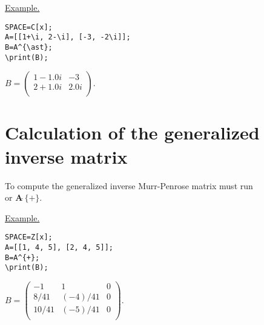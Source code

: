 \underline{Example. }

\vspace*{-2mm}
\begin{verbatim}
SPACE=C[x];
A=[[1+\i, 2-\i], [-3, -2\i]];
B=A^{\ast};
\print(B);
\end{verbatim}
 
{$
B = \left(\begin{array}{cc}
1-1. 0i& -3  \\
 2+1. 0i& 2. 0i\\ \end{array}\right). $}

\section{Calculation of the generalized inverse matrix}
To compute the generalized inverse  Murr-Penrose matrix must run \\
 or $\mathbf{A\widehat{\ } \{+\}}$. 

\underline{Example. }

\vspace*{-2mm}
\begin{verbatim}
SPACE=Z[x];
A=[[1, 4, 5], [2, 4, 5]];
B=A^{+};
\print(B);
\end{verbatim}

{$
B =  \left(\begin{array}{ccc}
-1& 1& 0\\
 8/41&  (-4)/41& 0\\
 10/41& (-5)/41& 0\\ \end{array}\right).$}
 
